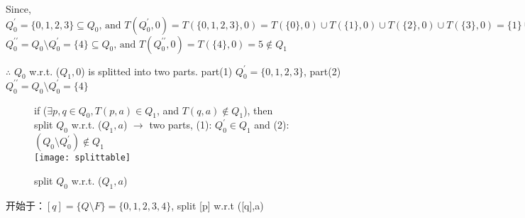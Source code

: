 Since, $Q_0^{\prime}=\{0,1,2,3\}\subseteq Q_0\text{, and }T(Q_0^{\prime},0) = T(\{0,1,2,3\},0)=T(\{0\},0)\cup T(\{1\},0)\cup T(\{2\},0)\cup T(\{3\},0) = \{1\} \cup \{2\} \cup \{3\} =\{1,2,3\}\in Q_1$ \\
$Q_0^{\prime\prime}=Q_0\setminus Q_0^\prime=\{4\}\subseteq Q_0\text{, and }T(Q_0^{\prime\prime},0) = T(\{4\},0)= {5}\notin Q_1$ 

$\therefore$
$Q_0$ w.r.t. ($Q_1,0$) is splitted into two parts. part(1) $Q_0^\prime=\{0,1,2,3\}$, part(2) $Q_0^{\prime\prime}=Q_0\setminus Q_0^\prime=\{4\}$

\begin{figure}[htbp]
	if ($\exists p,q\in Q_0,T(p,a)\in Q_1$, and  $T(q,a)\notin Q_1$), then \\
	split $Q_0$ w.r.t. ($Q_1,a$) $\to$ two parts, (1): $Q_0^\prime\in Q_1$ and (2):
	 $(Q_0\setminus Q_0^\prime)\notin Q_1$ \\
	\texttt{[image: splittable]}
	\caption{split $Q_0$ w.r.t. ($Q_1,a$) }
	\label{fig:split}
\end{figure}


开始于：$[q]=\{Q\setminus F\} = \{0,1,2,3,4\}$, split [p] w.r.t ([q],a)

